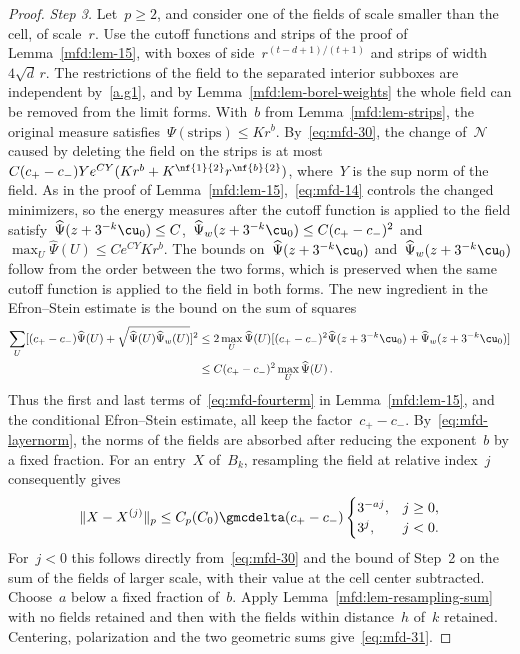 \documentclass[11pt]{amsart}
\begin{document}
\begin{proof}
\smallskip

\emph{Step 3.} Let~$p\geq2$, and consider one of the fields of scale smaller than the cell, of scale~$r$. Use the cutoff functions and strips of the proof of Lemma~\ref{mfd:lem-15}, with boxes of side~$r^{(t-d+1)/(t+1)}$ and strips of width~$4\sqrt d\,r$. The restrictions of the field to the separated interior subboxes are independent by~\ref{a.g1}, and by Lemma~\ref{mfd:lem-borel-weights} the whole field can be removed from the limit forms. With~$b$ from Lemma~\ref{mfd:lem-strips}, the original measure satisfies~$\Psi(\mathrm{strips})\leq Kr^b$. By~\eqref{eq:mfd-30}, the change of~$\mathcal N$ caused by deleting the field on the strips is at most~$C(c_+-c_-)Ye^{CY}(Kr^b+K^{\nf{1}{2}}r^{\nf{b}{2}})$, where~$Y$ is the sup norm of the field. As in the proof of Lemma~\ref{mfd:lem-15},~\eqref{eq:mfd-14} controls the changed minimizers, so the energy measures after the cutoff function is applied to the field satisfy~$\widehat\Psi(z+3^{-k}\cu_0)\leq C$,~$\widehat\Psi_w(z+3^{-k}\cu_0)\leq C(c_+-c_-)^2$ and~$\max_U\widehat\Psi(U)\leq Ce^{CY}Kr^b$. The bounds on~$\widehat\Psi(z+3^{-k}\cu_0)$ and~$\widehat\Psi_w(z+3^{-k}\cu_0)$ follow from the order between the two forms, which is preserved when the same cutoff function is applied to the field in both forms. The new ingredient in the Efron--Stein estimate is the bound on the sum of squares
\begin{align*}
	\sum_U[(c_+-c_-)\widehat\Psi(U)
	+\sqrt{\widehat\Psi(U)\widehat\Psi_w(U)}]^2
	& \leq2\max_U\widehat\Psi(U)
	[(c_+-c_-)^2\widehat\Psi(z+3^{-k}\cu_0)+\widehat\Psi_w(z+3^{-k}\cu_0)]
	\notag \\ & \leq C(c_+-c_-)^2\max_U\widehat\Psi(U)\,.
\end{align*}
Thus the first and last terms of~\eqref{eq:mfd-fourterm} in Lemma~\ref{mfd:lem-15}, and the conditional Efron--Stein estimate, all keep the factor~$c_+-c_-$. By~\eqref{eq:mfd-layernorm}, the norms of the fields are absorbed after reducing the exponent~$b$ by a fixed fraction. For an entry~$X$ of~$B_k$, resampling the field at relative index~$j$ consequently gives
\begin{equation*}
	\|X-X^{(j)}\|_p\leq C_p(C_0)\gmcdelta(c_+-c_-)
	\begin{cases}3^{-a j},&j\geq0,\\3^j,&j<0.\end{cases}
\end{equation*}
For~$j<0$ this follows directly from~\eqref{eq:mfd-30} and the bound of Step~2 on the sum of the fields of larger scale, with their value at the cell center subtracted. Choose~$a$ below a fixed fraction of~$b$. Apply Lemma~\ref{mfd:lem-resampling-sum} with no fields retained and then with the fields within distance~$h$ of~$k$ retained. Centering, polarization and the two geometric sums give~\eqref{eq:mfd-31}.
\end{proof}
\end{document}
